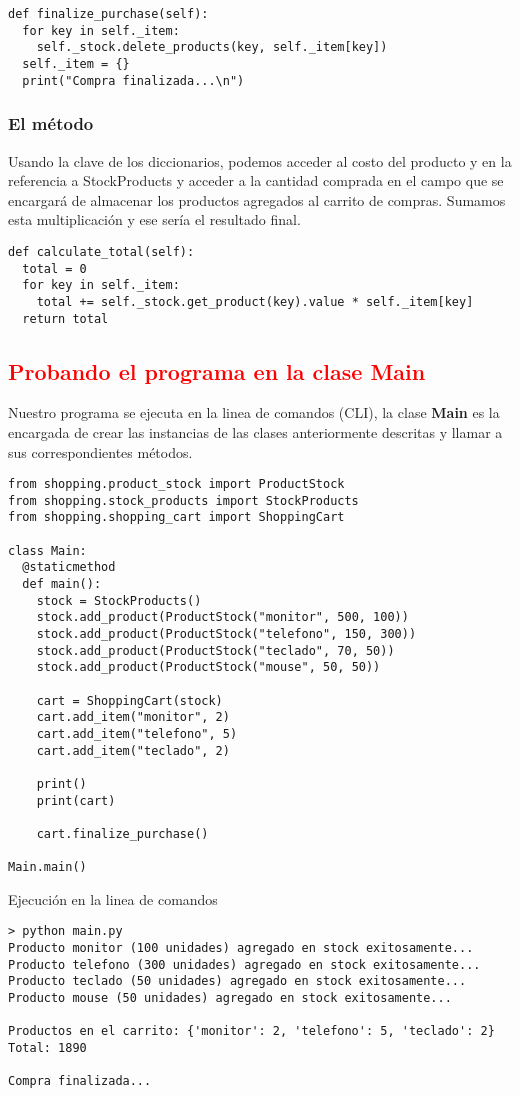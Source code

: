 \begin{verbatim}
def finalize_purchase(self):
  for key in self._item:
    self._stock.delete_products(key, self._item[key])
  self._item = {}
  print("Compra finalizada...\n")
\end{verbatim}

\subsubsection{El método }
Usando la clave de los diccionarios, podemos acceder al costo del producto y en la referencia a StockProducts y acceder a la cantidad comprada en el campo que se encargará de almacenar los productos agregados al carrito de compras. Sumamos esta multiplicación y ese sería el resultado final.

\begin{verbatim}
def calculate_total(self):
  total = 0
  for key in self._item:
    total += self._stock.get_product(key).value * self._item[key]
  return total
\end{verbatim}

\subsection{\textcolor{red}{Probando el programa en la clase Main}}
Nuestro programa se ejecuta en la linea de comandos (CLI), la clase \textbf{Main} es la encargada de crear las instancias de las clases anteriormente descritas y llamar a sus correspondientes métodos.

\begin{verbatim}
from shopping.product_stock import ProductStock
from shopping.stock_products import StockProducts
from shopping.shopping_cart import ShoppingCart

class Main:
  @staticmethod
  def main():
    stock = StockProducts()
    stock.add_product(ProductStock("monitor", 500, 100))
    stock.add_product(ProductStock("telefono", 150, 300))
    stock.add_product(ProductStock("teclado", 70, 50))
    stock.add_product(ProductStock("mouse", 50, 50))

    cart = ShoppingCart(stock)
    cart.add_item("monitor", 2)
    cart.add_item("telefono", 5)
    cart.add_item("teclado", 2)

    print()
    print(cart)

    cart.finalize_purchase()

Main.main()
\end{verbatim}

Ejecución en la linea de comandos
\begin{verbatim}
> python main.py
Producto monitor (100 unidades) agregado en stock exitosamente...
Producto telefono (300 unidades) agregado en stock exitosamente...
Producto teclado (50 unidades) agregado en stock exitosamente...
Producto mouse (50 unidades) agregado en stock exitosamente...

Productos en el carrito: {'monitor': 2, 'telefono': 5, 'teclado': 2}
Total: 1890

Compra finalizada...
\end{verbatim}
